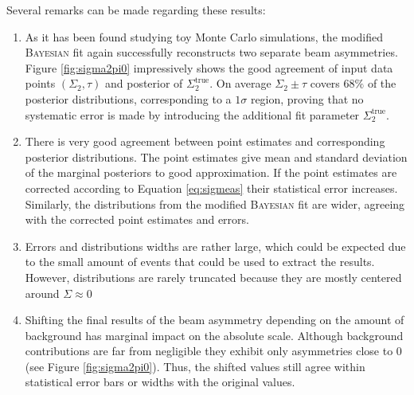 Several remarks can be made regarding these results:
\begin{enumerate}
	\item As it has been found studying toy Monte Carlo simulations, the modified \textsc{Bayesian} fit again successfully reconstructs two separate beam asymmetries. Figure \ref{fig:sigma2pi0} impressively shows the good agreement of input data points $\left(\Sigma_2,\tau\right)$ and posterior of $\Sigma_2^\text{true}$. On average $\Sigma_2\pm\tau$ covers $68\%$ of the posterior distributions, corresponding to a $1\sigma$ region, proving that no systematic error is made by introducing the additional fit parameter $\Sigma_2^\text{true}$.
	\item There is very good agreement between point estimates and corresponding posterior distributions. The point estimates give mean and standard deviation of the marginal posteriors to good approximation. If the point estimates are corrected according to Equation \eqref{eq:sigmeas} their statistical error increases. Similarly, the distributions from the modified \textsc{Bayesian} fit are wider, agreeing with the corrected point estimates and errors.
	\item Errors and distributions widths are rather large, which could be expected due to the small amount of events that could be used to extract the results. However, distributions are rarely truncated because they are mostly centered around $\Sigma\approx0$
	\item Shifting the final results of the beam asymmetry depending on the amount of background has marginal impact on the absolute scale. Although background contributions are far from negligible they exhibit only asymmetries close to $0$ (see Figure \ref{fig:sigma2pi0}). Thus, the shifted values still agree within statistical error bars or widths with the original values.
\end{enumerate}
